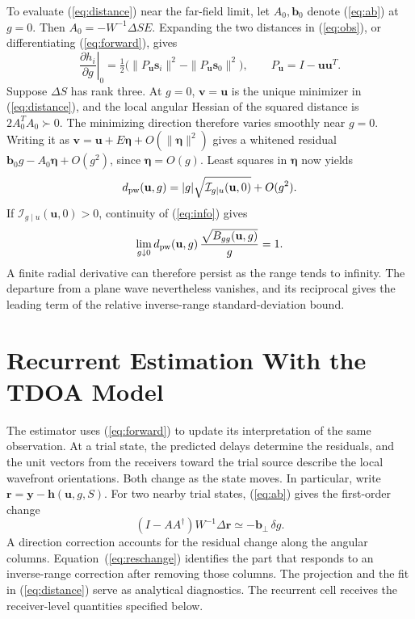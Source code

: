 \documentclass[journal]{IEEEtran}
\newcommand{\bu}{\mathbf{u}}
\newcommand{\bs}{\mathbf{s}}
\newcommand{\by}{\mathbf{y}}
\newcommand{\bh}{\mathbf{h}}
\begin{document}
To evaluate (\ref{eq:distance}) near the far-field limit, let \(A_0,\mathbf b_0\) denote (\ref{eq:ab}) at \(g=0\). Then \(A_0=-W^{-1}\Delta S E\). Expanding the two distances in (\ref{eq:obs}), or differentiating (\ref{eq:forward}), gives
\begin{equation}
 \left.\frac{\partial h_i}{\partial g}\right|_{0}
   =\tfrac12\big(\|P_{\bu}\bs_i\|^2-\|P_{\bu}\bs_0\|^2\big),
 \qquad P_{\bu}=I-\bu\bu^T .
 \label{eq:curvature}
\end{equation}
Suppose \(\Delta S\) has rank three. At \(g=0\), \(\mathbf v=\bu\) is the unique minimizer in (\ref{eq:distance}), and the local angular Hessian of the squared distance is \(2A_0^TA_0\succ0\). The minimizing direction therefore varies smoothly near \(g=0\). Writing it as \(\mathbf v=\bu+E\boldsymbol\eta+O(\|\boldsymbol\eta\|^2)\) gives a whitened residual \(\mathbf b_0 g-A_0\boldsymbol\eta+O(g^2)\), since \(\boldsymbol\eta=O(g)\). Least squares in \(\boldsymbol\eta\) now yields
\begin{equation}
 d_{\rm pw}(\bu,g)=|g|\sqrt{\mathcal I_{g\mid u}(\bu,0)}+O(g^2).
 \label{eq:expansion}
\end{equation}
If \(\mathcal I_{g\mid u}(\bu,0)>0\), continuity of (\ref{eq:info}) gives
\begin{equation}
 \lim_{g\downarrow0}d_{\rm pw}(\bu,g)\,\frac{\sqrt{B_{gg}(\bu,g)}}{g}=1 .
 \label{eq:relative}
\end{equation}
A finite radial derivative can therefore persist as the range tends to infinity. The departure from a plane wave nevertheless vanishes, and its reciprocal gives the leading term of the relative inverse-range standard-deviation bound.

\section{Recurrent Estimation With the TDOA Model}
\label{sec:method}
The estimator uses (\ref{eq:forward}) to update its interpretation of the same observation. At a trial state, the predicted delays determine the residuals, and the unit vectors from the receivers toward the trial source describe the local wavefront orientations. Both change as the state moves. In particular, write \(\mathbf r=\by-\bh(\bu,g,S)\). For two nearby trial states, (\ref{eq:ab}) gives the first-order change
\begin{equation}
 (I-AA^\dagger)W^{-1}\Delta\mathbf r \simeq -\mathbf b_\perp\,\delta g .
 \label{eq:reschange}
\end{equation}
A direction correction accounts for the residual change along the angular columns. Equation~(\ref{eq:reschange}) identifies the part that responds to an inverse-range correction after removing those columns. The projection and the fit in (\ref{eq:distance}) serve as analytical diagnostics. The recurrent cell receives the receiver-level quantities specified below.
\end{document}

